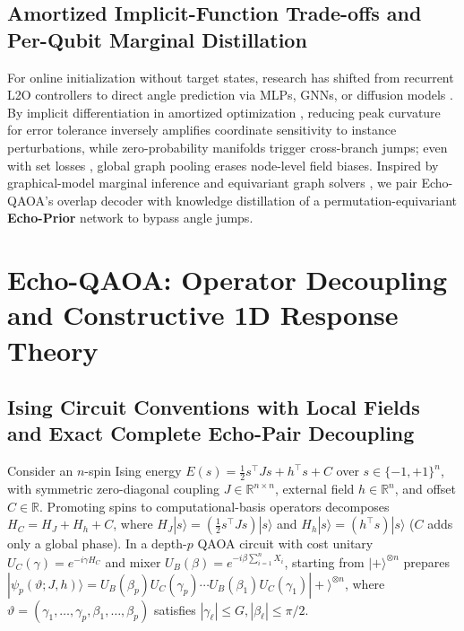 \documentclass{article}
\theoremstyle{plain}
\theoremstyle{definition}
\begin{document}
\subsection{Amortized Implicit-Function Trade-offs and Per-Qubit Marginal Distillation}\label{subsec:2_3}

For online initialization without target states, research has shifted from recurrent L2O controllers \citep{verdon2019learning} to direct angle prediction via MLPs, GNNs, or diffusion models \citep{amosy2024iteration,jain2022graph,jiang2025qseer,liang2024invited,meng2025conditional}. By implicit differentiation in amortized optimization \citep{amos2023tutorial,gould2021deep}, reducing peak curvature for error tolerance inversely amplifies coordinate sensitivity to instance perturbations, while zero-probability manifolds trigger cross-branch jumps; even with set losses \citep{rupprecht2017learning,zhang2019deep}, global graph pooling \citep{xu2019how} erases node-level field biases. Inspired by graphical-model marginal inference \citep{wainwright2008graphical} and equivariant graph solvers \citep{gilmer2017neural,karalias2020erdos,loshchilov2019decoupled,schuetz2022combinatorial}, we pair Echo-QAOA's overlap decoder with knowledge distillation \citep{hinton2015distilling} of a permutation-equivariant \textbf{Echo-Prior} network to bypass angle jumps.

\section{Echo-QAOA: Operator Decoupling and Constructive 1D Response Theory}\label{sec:3}

\subsection{Ising Circuit Conventions with Local Fields and Exact Complete Echo-Pair Decoupling}\label{subsec:3_1}

Consider an $n$-spin Ising energy $E(s)=\frac12s^\top Js+h^\top s+C$ over $s\in\{-1,+1\}^n$, with symmetric zero-diagonal coupling $J\in\mathbb R^{n\times n}$, external field $h\in\mathbb R^n$, and offset $C\in\mathbb R$. Promoting spins to computational-basis operators decomposes $H_C=H_J+H_h+C$, where $H_J|s\rangle=(\frac12s^\top Js)|s\rangle$ and $H_h|s\rangle=(h^\top s)|s\rangle$ ($C$ adds only a global phase). In a depth-$p$ QAOA circuit \citep{farhi2014quantum} with cost unitary $U_C(\gamma)=e^{-i\gamma H_C}$ and mixer $U_B(\beta)=e^{-i\beta\sum_{i=1}^n X_i}$, starting from $|+\rangle^{\otimes n}$ prepares $|\psi_p(\vartheta;J,h)\rangle=U_B(\beta_p)U_C(\gamma_p)\cdots U_B(\beta_1)U_C(\gamma_1)|+\rangle^{\otimes n}$, where $\vartheta=(\gamma_1,\ldots,\gamma_p,\beta_1,\ldots,\beta_p)$ satisfies $|\gamma_\ell|\le G, |\beta_\ell|\le\pi/2$.
\end{document}
